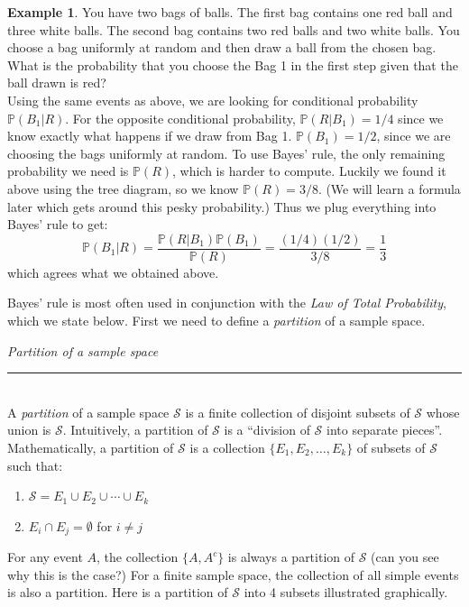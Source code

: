 \documentclass[12pt]{article}
\theoremstyle{definition}
\newtheorem*{example}{Example}
\theoremstyle{remark}
\def\P{{\mathbb P}}
\def\cals{{\mathcal S}}
\begin{document}
\begin{example}You have two bags of balls. The first bag contains one red ball and three white balls. The second bag contains two red balls and two white balls. You choose a bag uniformly at random and then draw a ball from the chosen bag. What is the probability that you choose the Bag 1 in the first step given that the ball drawn is red?\\

Using the same events as above, we are looking for conditional probability $\P(B_1|R)$. For the opposite conditional probability, $\P(R | B_1) = 1/4$ since we know exactly what happens if we draw from Bag 1. $\P(B_1) = 1/2$, since we are choosing the bags uniformly at random. To use Bayes' rule, the only remaining probability we need is $\P(R)$, which is harder to compute. Luckily we found it above using the tree diagram, so we know $\P(R) = 3/8$. (We will learn a formula later which gets around this pesky probability.) Thus we plug everything into Bayes' rule to get:
\[
\P(B_1| R) = \frac{ \P(R|B_1)\P(B_1)}{\P(R)} = \frac{ (1/4)(1/2) }{3/8} = \frac{1}{3}
\]
which agrees what we obtained above.
\end{example}

Bayes' rule is most often used in conjunction with the \emph{Law of Total Probability}, which we state below. First we need to define a \emph{partition} of a sample space.

\begin{framed}
\emph{Partition of a sample space}\\
  \rule{\dimexpr{}\fboxrule}{.1pt} \\
A \emph{partition} of a sample space $\cals$ is a finite collection of disjoint subsets of $\cals$ whose union is $\cals$. Intuitively, a partition of $\cals$ is a ``division of $\cals$ into separate pieces''. Mathematically, a partition of $\cals$ is a collection $\{E_1, E_2, \dots, E_k\}$ of subsets of $\cals$ such that:
\begin{enumerate}
\item $\cals = E_1 \cup E_2 \cup \cdots \cup E_k$
\item $E_i \cap E_j = \emptyset$ for $i \neq j$
\end{enumerate}
\end{framed}

For any event $A$, the collection $\{A, A^c\}$ is always a partition of $\cals$ (can you see why this is the case?) For a finite sample space, the collection of all simple events is also a partition. Here is a partition of $\cals$ into 4 subsets illustrated graphically.
\end{document}
